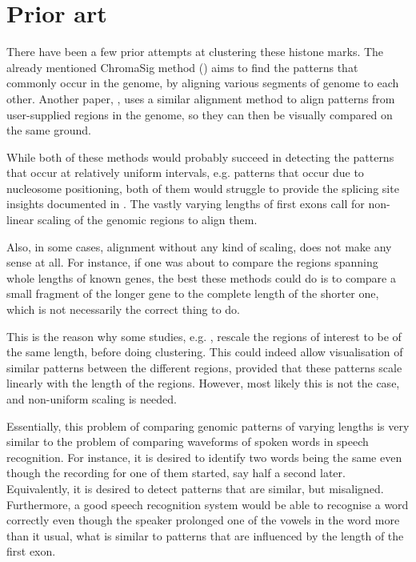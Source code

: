 \documentclass[parskip]{cs4rep}
\begin{document}
\section{Prior art}

There have been a few prior attempts at clustering these histone marks.
The already mentioned ChromaSig method (\cite{Hon:2008wv}) aims to find the patterns that commonly occur in the genome, by aligning various segments of genome to each other. Another paper, \cite{Lai:2010ue}, uses a similar alignment method to align patterns from user-supplied regions in the genome, so they can then be visually compared on the same ground.

While both of these methods would probably succeed in detecting the patterns that occur at relatively uniform intervals, e.g. patterns that occur due to nucleosome positioning, both of them would struggle to provide the splicing site insights documented in \cite{Bieberstein:2012tf}. The vastly varying lengths of first exons call for non-linear scaling of the genomic regions to align them.

Also, in some cases, alignment without any kind of scaling, does not make any sense at all. For instance, if one was about to compare the regions spanning whole lengths of known genes, the best these methods could do is to compare a small fragment of the longer gene to the complete length of the shorter one, which is not necessarily the correct thing to do. 

This is the reason why some studies, e.g. \cite{Taslim:vj}, rescale the regions of interest to be of the same length, before doing clustering. This could indeed allow visualisation of similar patterns between the different regions, provided that these patterns scale linearly with the length of the regions. However, most likely this is not the case, and non-uniform scaling is needed.

Essentially, this problem of comparing genomic patterns of varying lengths is very similar to the problem of comparing waveforms of spoken words in speech recognition. 
For instance, it is desired to identify two words being the same even though the recording for one of them started, say half a second later. Equivalently, it is desired to detect patterns that are similar, but misaligned. Furthermore, a good speech recognition system would be able to recognise a word correctly even though the speaker prolonged one of the vowels in the word more than it usual, what is similar to patterns that are influenced by the length of the first exon.
\end{document}

